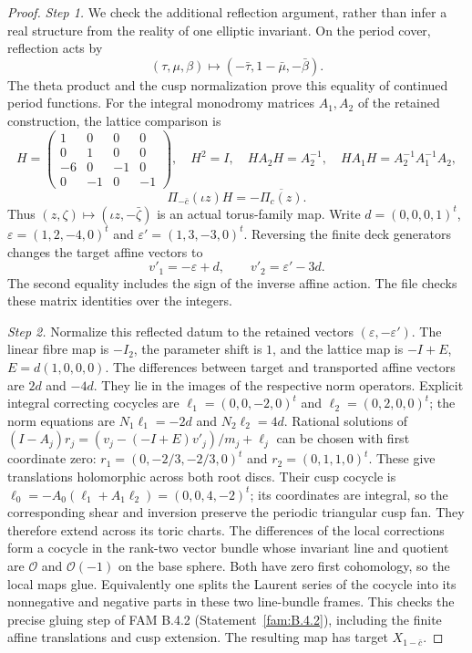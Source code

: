 \documentclass[11pt,a4paper]{article}
\theoremstyle{plain}
\theoremstyle{definition}
\begin{document}
\begin{proof}
\par\noindent\textit{Step 1.} We check the additional reflection argument, rather than infer a real
structure from the reality of one elliptic invariant. On the period
cover, reflection acts by
\[
 (\tau,\mu,\beta)\longmapsto(-\bar\tau,1-\bar\mu,-\bar\beta).
\]
The theta product and the cusp normalization prove this equality of
continued period functions. For the integral monodromy matrices
$A_1,A_2$ of the retained construction, the lattice comparison is
\[
 H=\begin{pmatrix}1&0&0&0\\0&1&0&0\\-6&0&-1&0\\0&-1&0&-1\end{pmatrix},
 \quad H^2=I,\quad HA_2H=A_2^{-1},\quad
 HA_1H=A_2^{-1}A_1^{-1}A_2,
\]
\[
 \Pi_{-\bar c}(\iota z)H=-\overline{\Pi_c(z)}.
\]
Thus $(z,\zeta)\mapsto(\iota z,-\bar\zeta)$ is an actual torus-family
map. Write $d=(0,0,0,1)^t$, $\varepsilon=(1,2,-4,0)^t$ and
$\varepsilon'=(1,3,-3,0)^t$. Reversing the finite deck generators
changes the target affine vectors to
\[
 v'_1=-\varepsilon+d,\qquad v'_2=\varepsilon'-3d.
\]
The second equality includes the sign of the inverse affine action.
The file  checks these matrix identities
over the integers.

\par\noindent\textit{Step 2.} Normalize this reflected datum to the retained vectors
$(\varepsilon,-\varepsilon')$. The linear fibre map is $-I_2$, the
parameter shift is $1$, and the lattice map is $-I+E$,
$E=d(1,0,0,0)$. The differences between target and transported affine
vectors are $2d$ and $-4d$. They lie in the images of the respective
norm operators. Explicit integral correcting cocycles are
$\ell_1=(0,0,-2,0)^t$ and $\ell_2=(0,2,0,0)^t$; the norm equations
are $N_1\ell_1=-2d$ and $N_2\ell_2=4d$. Rational solutions of
$(I-A_j)r_j=(v_j-(-I+E)v'_j)/m_j+\ell_j$ can be chosen with first
coordinate zero: $r_1=(0,-2/3,-2/3,0)^t$ and
$r_2=(0,1,1,0)^t$. These give translations holomorphic across both
root discs. Their cusp cocycle is
$\ell_0=-A_0(\ell_1+A_1\ell_2)=(0,0,4,-2)^t$; its coordinates are
integral, so the corresponding shear and inversion preserve the
periodic triangular cusp fan. They therefore extend across its toric
charts. The differences of the local corrections form a cocycle in
the rank-two vector bundle whose invariant line and quotient are
$\mathcal O$ and $\mathcal O(-1)$ on the base sphere. Both have zero
first cohomology, so the local maps glue. Equivalently one splits the
Laurent series of the cocycle into its nonnegative and negative
parts in these two line-bundle frames. This checks the precise
gluing step of FAM B.4.2 (Statement~\ref{fam:B.4.2}), including the finite affine translations
and cusp extension. The resulting map has target $X_{1-\bar c}$.


\end{proof}
\end{document}
